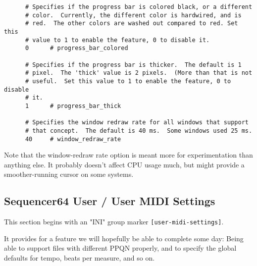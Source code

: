    \begin{verbatim}
      # Specifies if the progress bar is colored black, or a different
      # color.  Currently, the different color is hardwired, and is
      # red.  The other colors are washed out compared to red. Set this
      # value to 1 to enable the feature, 0 to disable it.
      0      # progress_bar_colored

      # Specifies if the progress bar is thicker.  The default is 1
      # pixel.  The 'thick' value is 2 pixels.  (More than that is not
      # useful.  Set this value to 1 to enable the feature, 0 to disable
      # it.
      1      # progress_bar_thick

      # Specifies the window redraw rate for all windows that support
      # that concept.  The default is 40 ms.  Some windows used 25 ms.
      40     # window_redraw_rate
   \end{verbatim}

   Note that the window-redraw rate option is meant more for experimentation
   than anything else.  It probably doesn't affect CPU usage much, but might
   provide a smoother-running cursor on some systems.

\subsection{Sequencer64 User / User MIDI Settings}
\label{subsec:seq64_usr_file_user_midi_settings}

   This section begins with an
   "INI" group marker \texttt{[user-midi-settings]}.

   It provides for a feature we will hopefully be able to complete some day:
   Being able to support files with different PPQN properly, and to specify the
   global defaults for tempo, beats per measure, and so on.


